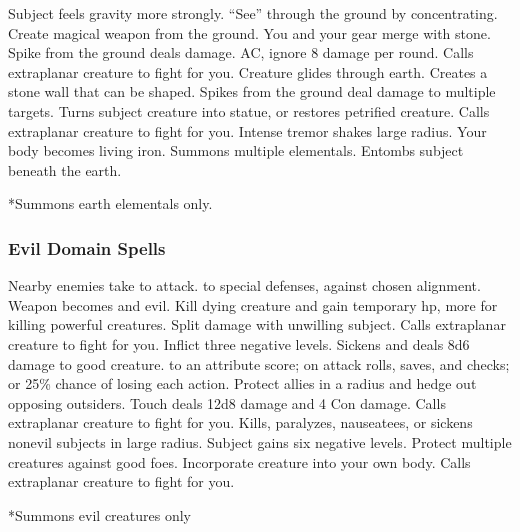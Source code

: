 \begin{spelllist}
     Subject feels gravity more strongly.
     ``See'' through the ground by concentrating.
     Create magical weapon from the ground.
    \spellhead[2]{}
     You and your gear merge with stone.
     Spike from the ground deals damage. 
      AC, ignore 8 damage per round.
     Calls extraplanar creature to fight for you.
     Creature glides through earth. 
     Creates a stone wall that can be shaped.
     Spikes from the ground deal damage to multiple targets.
     Turns subject creature into statue, or restores petrified creature.
    \spellhead[7]{}
     Calls extraplanar creature to fight for you.
     Intense tremor shakes large radius.
     Your body becomes living iron.
     Summons multiple elementals.
     Entombs subject beneath the earth.
\end{spelllist}
*Summons earth elementals only.

\subsubsection{Evil Domain Spells}

\begin{spelllist}
     Nearby enemies take  to attack.
      to special defenses,  against chosen alignment.
     Weapon becomes  and evil.
     Kill dying creature and gain temporary hp, more for killing powerful creatures.
     Split damage with unwilling subject.
     Calls extraplanar creature to fight for you.
     Inflict three negative levels.
     Sickens and deals 8d6 damage to good creature.
      to an attribute score;  on attack rolls, saves, and checks; or 25\% chance of losing each action.
     Protect allies in a \areamed radius and hedge out opposing outsiders.
     Touch deals 12d8 damage and 4 Con damage.
     Calls extraplanar creature to fight for you.
     Kills, paralyzes, nauseatees, or sickens nonevil subjects in large radius.
    \spellhead[7]{}
     Subject gains six negative levels.
    \F Protect multiple creatures against good foes. 
     Incorporate creature into your own body.
     Calls extraplanar creature to fight for you.
\end{spelllist}
*Summons evil creatures only

